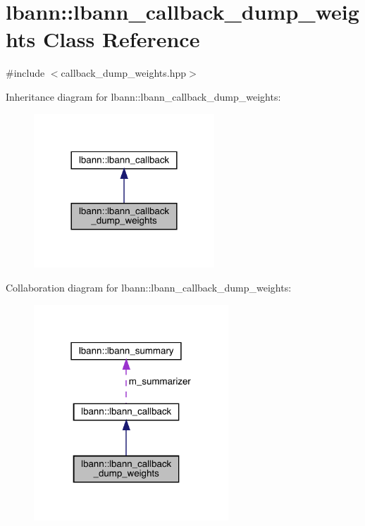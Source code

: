 \hypertarget{classlbann_1_1lbann__callback__dump__weights}{}\section{lbann\+:\+:lbann\+\_\+callback\+\_\+dump\+\_\+weights Class Reference}
\label{classlbann_1_1lbann__callback__dump__weights}


{\ttfamily \#include $<$callback\+\_\+dump\+\_\+weights.\+hpp$>$}



Inheritance diagram for lbann\+:\+:lbann\+\_\+callback\+\_\+dump\+\_\+weights\+:\nopagebreak
\begin{figure}[H]
\begin{center}
\leavevmode
\includegraphics[width=192pt]{classlbann_1_1lbann__callback__dump__weights__inherit__graph}
\end{center}
\end{figure}


Collaboration diagram for lbann\+:\+:lbann\+\_\+callback\+\_\+dump\+\_\+weights\+:\nopagebreak
\begin{figure}[H]
\begin{center}
\leavevmode
\includegraphics[width=207pt]{classlbann_1_1lbann__callback__dump__weights__coll__graph}
\end{center}
\end{figure}
